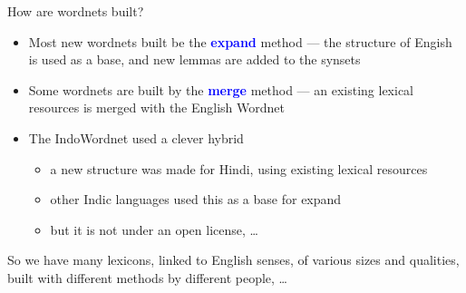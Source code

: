 \documentclass[xetex]{beamer}  %
\newcommand{\txx}[1]{\textbf{\textcolor{blue}{#1}}}
\begin{document}


\begin{frame}{How are wordnets built?}

  \begin{itemize}
  \item Most new wordnets built be the \txx{expand} method --- the
    structure of Engish is used as a base, and new lemmas are added to the synsets
  \item Some wordnets are built by  the \txx{merge} method --- an existing lexical resources is merged with the English Wordnet
  \item The IndoWordnet \citep{Bhattacharyya:2010} used a clever hybrid
    \begin{itemize}
    \item a new structure was made for Hindi, using existing lexical resources 
    \item other Indic languages used this as a base for expand 
    \item but it is not under an open license, \ldots
    \end{itemize}

  \end{itemize}
  
So we have many lexicons, linked to English senses, of various sizes and qualities, built with different methods by different people, \ldots
  
\end{frame}
\end{document}

